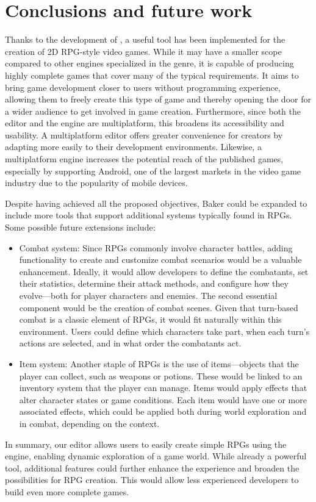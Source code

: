 \chapter*{Conclusions and future work}
\label{cap:futurework}

Thanks to the development of \baker, a useful tool has been implemented for the creation of 2D RPG-style video games. While it may have a smaller scope compared to other engines specialized in the genre, it is capable of producing highly complete games that cover many of the typical requirements. It aims to bring game development closer to users without programming experience, allowing them to freely create this type of game and thereby opening the door for a wider audience to get involved in game creation. Furthermore, since both the editor and the engine are multiplatform, this broadens its accessibility and usability. A multiplatform editor offers greater convenience for creators by adapting more easily to their development environments. Likewise, a multiplatform engine increases the potential reach of the published games, especially by supporting Android, one of the largest markets in the video game industry due to the popularity of mobile devices.

\medskip

Despite having achieved all the proposed objectives, Baker could be expanded to include more tools that support additional systems typically found in RPGs. Some possible future extensions include:

\begin{itemize}
\item Combat system: Since RPGs commonly involve character battles, adding functionality to create and customize combat scenarios would be a valuable enhancement. Ideally, it would allow developers to define the combatants, set their statistics, determine their attack methods, and configure how they evolve—both for player characters and enemies. The second essential component would be the creation of combat scenes. Given that turn-based combat is a classic element of RPGs, it would fit naturally within this environment. Users could define which characters take part, when each turn’s actions are selected, and in what order the combatants act.

\item Item system: Another staple of RPGs is the use of items—objects that the player can collect, such as weapons or potions. These would be linked to an inventory system that the player can manage. Items would apply effects that alter character states or game conditions. Each item would have one or more associated effects, which could be applied both during world exploration and in combat, depending on the context.
\end{itemize}

\medskip

In summary, our editor allows users to easily create simple RPGs using the engine, enabling dynamic exploration of a game world. While already a powerful tool, additional features could further enhance the experience and broaden the possibilities for RPG creation. This would allow less experienced developers to build even more complete games.